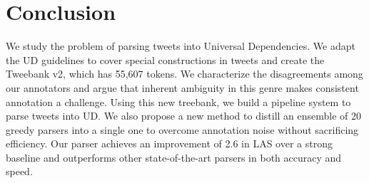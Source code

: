 \documentclass[11pt,a4paper]{article}
\begin{document}

\section{Conclusion}
We study the problem of parsing tweets into Universal Dependencies.
We adapt the UD guidelines to cover 
special constructions in tweets and create
the {\sc Tweebank v2}, which has 55,607 tokens. We characterize the disagreements
among our annotators and argue that inherent ambiguity in this genre
makes
consistent annotation a challenge.  Using this new treebank,
we build a pipeline system to parse tweets into UD. We also 
propose a new method to distill an ensemble of 20 greedy parsers into a single one
to overcome annotation noise without sacrificing efficiency.
Our parser achieves an improvement of 2.6  in LAS over a strong baseline
and outperforms other state-of-the-art parsers in both accuracy and speed.
\end{document}
